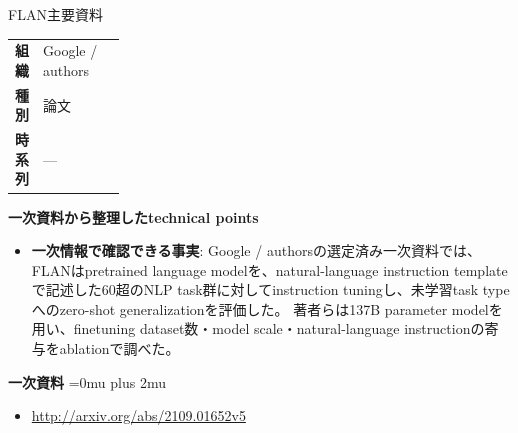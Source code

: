 \begin{technicalnote}{FLAN}{主要資料}
\begingroup
\begin{tabularx}{\linewidth}{@{}>{\bfseries}p{0.22\linewidth}X@{}}
組織 & Google / authors \\
種別 & 論文 \\
時系列 & — \\
\end{tabularx}
\smallskip
{\bfseries 一次資料から整理したtechnical points}
\begin{itemize}[leftmargin=1.5em,itemsep=0.35em]
\item \textbf{一次情報で確認できる事実}: Google / authorsの選定済み一次資料では、FLANはpretrained language modelを、natural-language instruction templateで記述した60超のNLP task群に対してinstruction tuningし、未学習task typeへのzero-shot generalizationを評価した。 著者らは137B parameter modelを用い、finetuning dataset数・model scale・natural-language instructionの寄与をablationで調べた。
\end{itemize}
\begin{minipage}{\linewidth}
\begin{samepage}
{\bfseries 一次資料}
\begingroup\sloppy
\Urlmuskip=0mu plus 2mu\relax
\begin{itemize}[leftmargin=1.5em,itemsep=0.25em]
\item {\scriptsize\url{http://arxiv.org/abs/2109.01652v5}}
\end{itemize}
\endgroup
\end{samepage}
\end{minipage}
\endgroup
\end{technicalnote}
\medskip

